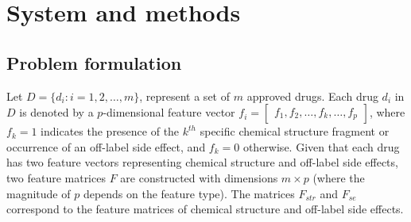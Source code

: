 \documentclass[unnumsec,webpdf,contemporary,large]{oup-authoring-template}%
\theoremstyle{thmstyleone}%
\theoremstyle{thmstyletwo}%
\theoremstyle{thmstylethree}%
\begin{document}
\section{System and methods}\label{sec2}
\subsection{Problem formulation}
Let $D = \{d_i: i = 1, 2, \ldots, m\}$, represent a set of $m$ approved drugs. Each drug $d_i$ in $D$ is denoted by a $p$-dimensional feature vector $f_i = \begin{bmatrix}f_1, f_2, \ldots, f_k, \ldots, f_p\end{bmatrix}$, where $f_k = 1$ indicates the presence of the $k^{th}$ specific chemical structure fragment or occurrence of an off-label side effect, and $f_k = 0$ otherwise. Given that each drug has two feature vectors representing chemical structure and off-label side effects, two feature matrices $F$ are constructed with dimensions $m \times p$ (where the magnitude of $p$ depends on the feature type). The matrices $F_{str}$ and $F_{se}$ correspond to the feature matrices of chemical structure and off-label side effects.
\end{document}
